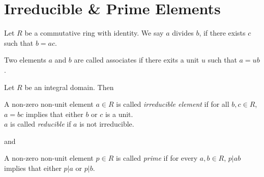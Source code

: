 \section{Irreducible \& Prime Elements}
\begin{definition}
    Let $R$ be a commutative ring with identity. We say $a$ divides $b$, if there exists $c$ such that $b = ac$.
\end{definition}
\begin{definition}
    Two elements $a$ and $b$ are called associates if there exits a unit $u$ such that $a = ub$.
\end{definition}
Let $R$ be an integral domain. Then
\begin{definition}[Irreducible]
    A non-zero non-unit element $a \in R$ is called \textit{irreducible element} if for all $b,c \in R$, $a = bc$ implies that either $b$ or $c$ is a unit.\\
    $a$ is called \textit{reducible} if $a$ is not irreducible.
\end{definition}
and
\begin{definition}[Prime]
    A non-zero non-unit element $p \in R$ is called \textit{prime} if for every $a, b \in R$, $p | ab$ implies that either $p | a$ or $p | b$.
\end{definition}

 
